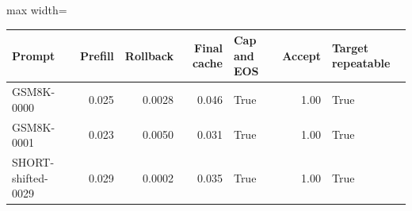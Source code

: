 \scriptsize
\setlength{\tabcolsep}{3.5pt}
\label{tab:t3real}
\begin{adjustbox}{max width=\linewidth}
\begin{tabular}{lrrrlrl}
\toprule
Prompt & Prefill & Rollback & Final cache & Cap and EOS & Accept & Target repeatable \\
\midrule
GSM8K-0000 & 0.025 & 0.0028 & 0.046 & True & 1.00 & True \\
GSM8K-0001 & 0.023 & 0.0050 & 0.031 & True & 1.00 & True \\
SHORT-shifted-0029 & 0.029 & 0.0002 & 0.035 & True & 1.00 & True \\
\bottomrule
\end{tabular}
\end{adjustbox}
